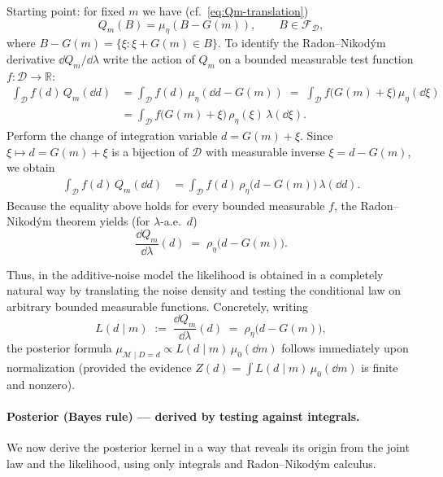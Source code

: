 \documentclass[11pt]{article}
\theoremstyle{remark}
\newcommand{\modelspace}{\mathcal{M}}
\newcommand{\dataspace}{\mathcal{D}}
\begin{document}
Starting point: for fixed \(m\) we have (cf.\ \eqref{eq:Qm-translation})
\[
Q_m(B)=\mu_\eta(B-G(m)),\qquad B\in\mathcal{F}_{\dataspace},
\]
where \(B-G(m)=\{\xi:\xi+G(m)\in B\}\).  To identify the Radon--Nikod\'ym
derivative \(\dd Q_m/\dd\lambda\) write the action of \(Q_m\) on a bounded
measurable test function \(f:\dataspace\to\mathbb{R}\):
\begin{align}
\int_{\dataspace} f(d)\,Q_m(\dd d)
&= \int_{\dataspace} f(d)\,\mu_\eta(\dd d - G(m))
\;=\; \int_{\dataspace} f\bigl(G(m)+\xi\bigr)\,\mu_\eta(\dd\xi) \\
&= \int_{\dataspace} f\bigl(G(m)+\xi\bigr)\,\rho_\eta(\xi)\,\lambda(\dd\xi).
\end{align}
Perform the change of integration variable \(d=G(m)+\xi\). Since \(\xi\mapsto d=G(m)+\xi\)
is a bijection of \(\dataspace\) with measurable inverse \(\xi=d-G(m)\), we obtain
\begin{align}
\int_{\dataspace} f(d)\,Q_m(\dd d)
&= \int_{\dataspace} f(d)\,\rho_\eta\bigl(d-G(m)\bigr)\,\lambda(\dd d).
\end{align}
Because the equality above holds for every bounded measurable \(f\), the Radon--Nikod\'ym
theorem yields (for \(\lambda\)-a.e.\ \(d\))
\begin{equation}\label{eq:likelihood-derivation}
\frac{\dd Q_m}{\dd\lambda}(d)
\;=\;
\rho_\eta\!\bigl(d-G(m)\bigr).
\end{equation}



Thus, in the additive-noise model the likelihood is obtained in a completely
natural way by translating the noise density and testing the conditional law
on arbitrary bounded measurable functions. Concretely, writing
\begin{equation}\label{eq:likelihood-final}
L(d\mid m)\;:=\;\frac{\dd Q_m}{\dd\lambda}(d)
\;=\;
\rho_\eta\!\bigl(d-G(m)\bigr),
\end{equation}
the posterior formula \(\mu_{\modelspace\mid D=d}\propto L(d\mid m)\,\mu_0(\dd m)\)
follows immediately upon normalization (provided the evidence \(Z(d)=\int L(d\mid m)\,\mu_0(\dd m)\)
is finite and nonzero).


\paragraph{Posterior (Bayes rule) --- derived by testing against integrals.}
We now derive the posterior kernel in a way that reveals its origin from the
joint law and the likelihood, using only integrals and Radon--Nikod\'ym calculus.
\end{document}
